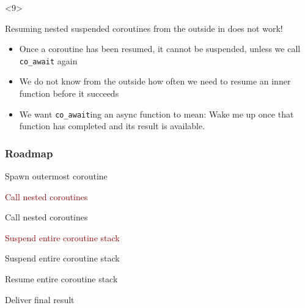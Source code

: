 \documentclass[aspectratio=169]{beamer}
\newif\iftransitions
\newcommand{\cpause}{\iftransitions \pause \fi}
\newcommand{\cmark}{\ding{51}}%
\newcommand{\xmark}{\ding{55}}%
\newcommand{\done}{\rlap{$\square$}{\raisebox{2pt}{\large\hspace{1pt}\cmark}}%
\hspace{-2.5pt}}
\newcommand{\wontfix}{\rlap{$\square$}{\large\hspace{1pt}\xmark}}
\begin{document}
\begin{frame}[fragile]
  \begin{onlyenv}<9>
  \end{onlyenv}

\end{frame}

\begin{frame}
  Resuming nested suspended coroutines from the outside in does not work!

  \cpause
  \begin{itemize}
  \item Once a coroutine has been resumed, it cannot be suspended, unless we call \texttt{co\_await} again \cpause
  \item We do not know from the outside how often we need to resume an inner function before it succeeds \cpause
  \item We want \texttt{co\_await}ing an async function to mean: Wake me up once that function has completed and its result is available.
  \end{itemize}

\end{frame}


\begin{frame}
  \frametitle{Roadmap}
  \begin{todolist}
  \item Spawn outermost coroutine
   {\item[\done] \textcolor{darkred}{Call nested coroutines}}
   {\item[\wontfix] Call nested coroutines}
   {\item[\done] \textcolor{darkred}{Suspend entire coroutine stack}}
   {\item[\wontfix] Suspend entire coroutine stack}
  \item Resume entire coroutine stack
  \item Deliver final result
  \end{todolist}
\end{frame}
\end{document}
